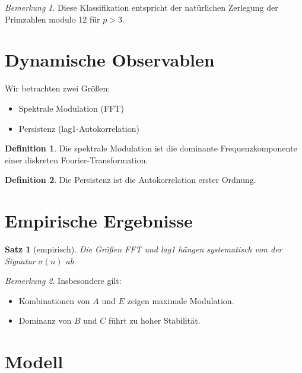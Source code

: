 \documentclass[11pt]{article}
\newtheorem{satz}{Satz}
\theoremstyle{definition}
\newtheorem{definition}{Definition}
\theoremstyle{remark}
\newtheorem{bemerkung}{Bemerkung}
\begin{document}
	\begin{bemerkung}
		Diese Klassifikation entspricht der natürlichen Zerlegung der Primzahlen modulo 12 für $p>3$.
	\end{bemerkung}
	
	\section{Dynamische Observablen}
	
	Wir betrachten zwei Größen:
	
	\begin{itemize}
		\item Spektrale Modulation (FFT)
		\item Persistenz (lag1-Autokorrelation)
	\end{itemize}
	
	\begin{definition}
		Die spektrale Modulation ist die dominante Frequenzkomponente einer diskreten Fourier-Transformation.
	\end{definition}
	
	\begin{definition}
		Die Persistenz ist die Autokorrelation erster Ordnung.
	\end{definition}
	
	\section{Empirische Ergebnisse}
	
	\begin{satz}[empirisch]
		Die Größen FFT und lag1 hängen systematisch von der Signatur $\sigma(n)$ ab.
	\end{satz}
	
	\begin{bemerkung}
		Insbesondere gilt:
		\begin{itemize}
			\item Kombinationen von $A$ und $E$ zeigen maximale Modulation.
			\item Dominanz von $B$ und $C$ führt zu hoher Stabilität.
		\end{itemize}
	\end{bemerkung}
	
	\section{Modell}
	
\end{document}
